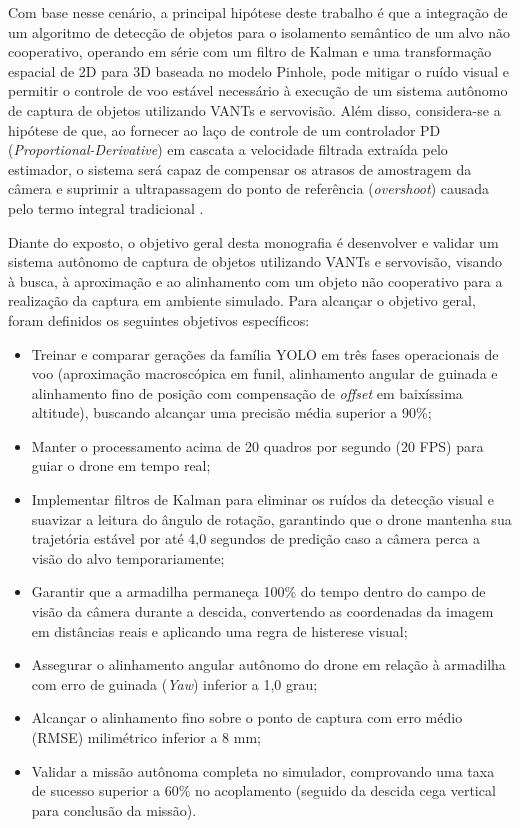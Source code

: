 Com base nesse cenário, a principal hipótese deste trabalho é que a integração de um algoritmo de detecção de objetos para o isolamento semântico de um alvo não cooperativo, operando em série com um filtro de Kalman e uma transformação espacial de 2D para 3D baseada no modelo Pinhole, pode mitigar o ruído visual e permitir o controle de voo estável necessário à execução de um sistema autônomo de captura de objetos utilizando VANTs e servovisão. Além disso, considera-se a hipótese de que, ao fornecer ao laço de controle de um controlador PD (\textit{Proportional-Derivative}) em cascata a velocidade filtrada extraída pelo estimador, o sistema será capaz de compensar os atrasos de amostragem da câmera e suprimir a ultrapassagem do ponto de referência (\textit{overshoot}) causada pelo termo integral tradicional \cite{shang2016, jiang2021, fagundes2025}.

Diante do exposto, o objetivo geral desta monografia é desenvolver e validar um sistema autônomo de captura de objetos utilizando VANTs e servovisão, visando à busca, à aproximação e ao alinhamento com um objeto não cooperativo para a realização da captura em ambiente simulado. Para alcançar o objetivo geral, foram definidos os seguintes objetivos específicos:

\begin{itemize}
	
    \item Treinar e comparar gerações da família YOLO em três fases operacionais de voo (aproximação macroscópica em funil, alinhamento angular de guinada e alinhamento fino de posição com compensação de \textit{offset} em baixíssima altitude), buscando alcançar uma precisão média superior a 90\%;
    
    \item Manter o processamento acima de 20 quadros por segundo (20 FPS) para guiar o drone em tempo real;
	
	\item Implementar filtros de Kalman para eliminar os ruídos da detecção visual e suavizar a leitura do ângulo de rotação, garantindo que o drone mantenha sua trajetória estável por até 4,0 segundos de predição caso a câmera perca a visão do alvo temporariamente;
	
	\item Garantir que a armadilha permaneça 100\% do tempo dentro do campo de visão da câmera durante a descida, convertendo as coordenadas da imagem em distâncias reais e aplicando uma regra de histerese visual;
	
	\item Assegurar o alinhamento angular autônomo do drone em relação à armadilha com erro de guinada (\textit{Yaw}) inferior a 1,0 grau;
	
	\item Alcançar o alinhamento fino sobre o ponto de captura com erro médio (RMSE) milimétrico inferior a 8 mm;
	
	\item Validar a missão autônoma completa no simulador, comprovando uma taxa de sucesso superior a 60\% no acoplamento (seguido da descida cega vertical para conclusão da missão).
	
\end{itemize}


